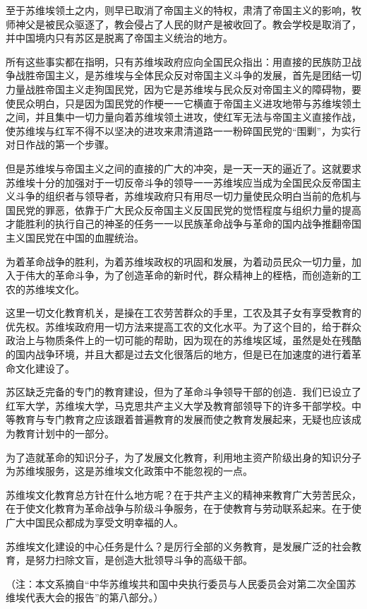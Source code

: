 至于苏维埃领土之内，则早已取消了帝国主义的特权，肃清了帝国主义的影响，牧师神父是被民众驱逐了，教会侵占了人民的财产是被收回了。教会学校是取消了，并中国境内只有苏区是脱离了帝国主义统治的地方。

所有这些事实都在指明，只有苏维埃政府应向全国民众指出：用直接的民族防卫战争战胜帝国主义，是苏维埃与全体民众反对帝国主义斗争的发展，首先是团结一切力量战胜帝国主义走狗国民党，因为它是苏维埃与民众反对帝国主义的障碍物，要使民众明白，只是因为国民党的作梗一一它横直于帝国主义进攻地带与苏维埃领土之间，并且集中一切力量向着苏维埃领土进攻，使红军无法与帝国主义直接作战，使苏维埃与红军不得不以坚决的进攻来肃清道路一一粉碎国民党的“围剿”，为实行对日作战的第一个步骤。

但是苏维埃与帝国主义之间的直接的广大的冲突，是一天一天的逼近了。这就要求苏维埃十分的加强对于一切反帝斗争的领导一一苏维埃应当成为全国民众反帝国主义斗争的组织者与领导者，苏维埃政府只有用尽一切力量使民众明白当前的危机与国民党的罪恶，依靠于广大民众反帝国主义反国民党的觉悟程度与组织力量的提高才能胜利的执行自己的神圣的任务一一以民族革命战争与革命的国内战争推翻帝国主义国民党在中国的血腥统治。

为着革命战争的胜利，为着苏维埃政权的巩固和发展，为着动员民众一切力量，加入于伟大的革命斗争，为了创造革命的新时代，群众精神上的桎梏，而创造新的工农的苏维埃文化。

这里一切文化教育机关，是操在工农劳苦群众的手里，工农及其子女有享受教育的优先权。苏维埃政府用一切方法来提高工农的文化水平。为了这个目的，给于群众政治上与物质条件上的一切可能的帮助，因为现在的苏维埃区域，虽然是处在残酷的国内战争环境，并且大都是过去文化很落后的地方，但是已在加速度的进行着革命文化建设了。

苏区缺乏完备的专门的教育建设，但为了革命斗争领导干部的创造．我们已设立了红军大学，苏维埃大学，马克思共产主义大学及教育部领导下的许多干部学校。中等教育与专门教育之应该跟着普遍教育的发展而使之教育发展起来，无疑也应该成为教育计划中的一部分。

为了造就革命的知识分子，为了发展文化教育，利用地主资产阶级出身的知识分子为苏维埃服务，这是苏维埃文化政策中不能忽视的一点。

苏维埃文化教育总方针在什么地方呢？在于共产主义的精神来教育广大劳苦民众，在于使文化教育为革命战争与阶级斗争服务，在于使教育与劳动联系起来。在于使广大中国民众都成为享受文明幸福的人。

苏维埃文化建设的中心任务是什么？是厉行全部的义务教育，是发展广泛的社会教育，是努力扫除文盲，是创造大批领导斗争的高级干部。

（注：本文系摘自“中华苏维埃共和国中央执行委员与人民委员会对第二次全国苏维埃代表大会的报告”的第八部分。）


